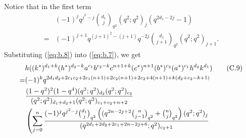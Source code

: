 \documentclass[table,a4paper,reqno]{amsart}
\numberwithin{equation}{section}
\theoremstyle{definition}
\begin{document}
Notice that in the first term
\begin{equation}\label{eq:b.8}
    \begin{split}
        &(-1)^{j}q^{j^2-j}{d_1\choose j}_{q^{2}}(q^2;q^2)_{j}(q^{2d_1-2j}-1)\\
        =&(-1)^{j+1}q^{(j+1)^2-(j+1)}q^{-2j}{d_1\choose j+1}_{q^{2}}(q^2;q^2)_{j+1}.
    \end{split}
\end{equation}
Substituting (\ref{eq:b.8}) into (\ref{eq:b.7}), we get
\begin{align}\stepcounter{equation}
        &h((k^*)^{d_1+k}(h^*)^{d_2-k}a^{c_1}b^{c_2-k}c^{n+1+k}(c^*)^{n+1}(b^*)^{c_2}(a^*)^{c_1}h^{d_2}k^{d_1})\tag{C.9}\\
        =&(-1)^kq^{2d_1d_2+2c_1c_2+2c_1(n+1)+2c_2(n+1)+2c_2+4(n+1)+k(d_2+c_2-k+1)}\notag\\
        &\frac{(1-q^2)^2(1-q^4)(q^2;q^2)_{d_2}(q^2;q^2)_{c_2}}{(q^2;q^2)_{d_1+d_2+1}(q^2;q^2)_{c_1+c_2+n+2}}\notag\\
        &\left(\sum_{j=0}^{n}\frac{(-1)^{j}q^{j^2-j}{d_1\choose j}_{q^{2}}\left((q^{2n-2j+2}{n\choose j-1}_{q^2}+{n\choose j}_{q^2}\right)(q^2;q^2)_{j}}{(q^{2d_1+2d_2+2c_1+2n-2j+6};q^2)_{c_2+1}}\right.\notag\\

\end{align}
\end{document}
